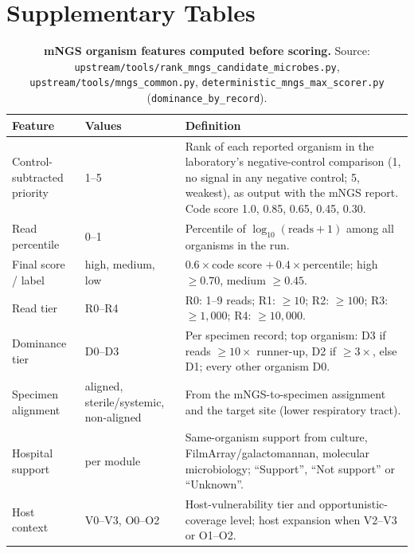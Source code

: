 \documentclass[11pt,a4paper]{article}
\newcommand{\mngs}{mNGS\xspace}
\newcommand{\filmarray}{FilmArray\xspace}
\begin{document}
\clearpage
\section*{Supplementary Tables}

\begin{table}[h]
\centering
\caption{\textbf{\mngs organism features computed before scoring.} Source: \texttt{upstream/tools/rank\_mngs\_candidate\_microbes.py}, \texttt{upstream/tools/mngs\_common.py}, \texttt{deterministic\_mngs\_max\_scorer.py} (\texttt{dominance\_by\_record}).}
\label{tab:s1}
\footnotesize
\begin{tabular}{p{2.8cm}p{2.4cm}p{9.4cm}}
\toprule
Feature & Values & Definition \\
\midrule
Control-subtracted priority & 1--5 & Rank of each reported organism in the laboratory's negative-control comparison (1, no signal in any negative control; 5, weakest), as output with the \mngs report. Code score 1.0, 0.85, 0.65, 0.45, 0.30. \\
Read percentile & 0--1 & Percentile of $\log_{10}(\text{reads}+1)$ among all organisms in the run. \\
Final score / label & high, medium, low & $0.6\times$code score $+\,0.4\times$percentile; high $\ge 0.70$, medium $\ge 0.45$. \\
Read tier & R0--R4 & R0: 1--9 reads; R1: $\ge 10$; R2: $\ge 100$; R3: $\ge 1{,}000$; R4: $\ge 10{,}000$. \\
Dominance tier & D0--D3 & Per specimen record; top organism: D3 if reads $\ge 10\times$ runner-up, D2 if $\ge 3\times$, else D1; every other organism D0. \\
Specimen alignment & aligned, sterile/systemic, non-aligned & From the \mngs-to-specimen assignment and the target site (lower respiratory tract). \\
Hospital support & per module & Same-organism support from culture, \filmarray/galactomannan, molecular microbiology; ``Support'', ``Not support'' or ``Unknown''. \\
Host context & V0--V3, O0--O2 & Host-vulnerability tier and opportunistic-coverage level; host expansion when V2--V3 or O1--O2. \\
\bottomrule
\end{tabular}
\end{table}
\end{document}
